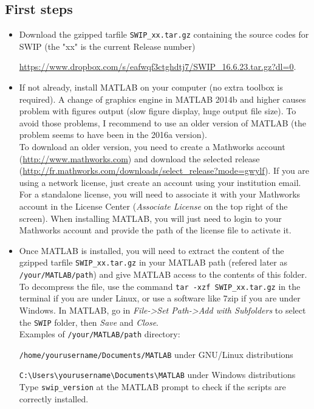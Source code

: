 \documentclass[twoside,a4paper]{article}
\begin{document}
\subsection{First steps}
\begin{itemize}
\setlength\itemsep{2ex}
\setlength{\parindent}{5ex}
\item Download the gzipped tarfile \verb|SWIP_xx.tar.gz| containing the source codes for SWIP (the "xx" is the current Release number)

\url{https://www.dropbox.com/s/eafwqf3ctghdtj7/SWIP_16.6.23.tar.gz?dl=0}.

\item If not already, install MATLAB on your computer (no extra toolbox is required). A change of graphics engine in MATLAB 2014b and higher causes problem with figures output (slow figure display, huge output file size). To avoid those problems, I recommend to use an older version of MATLAB (the problem seems to have been in the 2016a version).\\[1ex]
To download an older version, you need to create a Mathworks account (\url{http://www.mathworks.com}) and download the selected release (\url{http://fr.mathworks.com/downloads/select_release?mode=gwylf}). If you are using a network license, just create an account using your institution email. For a standalone license, you will need to associate it with your Mathworks account in the License Center (\textit{Associate License} on the top right of the screen). When installing MATLAB, you will just need to login to your Mathworks account and provide the path of the license file to activate it.

\item Once MATLAB is installed, you will need to extract the content of the gzipped tarfile \verb|SWIP_xx.tar.gz| in your MATLAB path (refered later as \verb|/your/MATLAB/path|) and give MATLAB access to the contents of this folder. To decompress the file, use the command \verb|tar -xzf SWIP_xx.tar.gz| in the terminal if you are under Linux, or use a software like 7zip if you are under Windows. In MATLAB, go in \textit{File->Set Path->Add with Subfolders} to select the \verb|SWIP| folder, then \textit{Save} and \textit{Close}.\\[1ex]
Examples of \verb|/your/MATLAB/path| directory:

\verb|/home/yourusername/Documents/MATLAB| under GNU/Linux distributions

\verb|C:\Users\yourusername\Documents\MATLAB| under Windows distributions\\[1ex]
Type \verb|swip_version| at the MATLAB prompt to check if the scripts are correctly installed.
\end{itemize}
\end{document}
